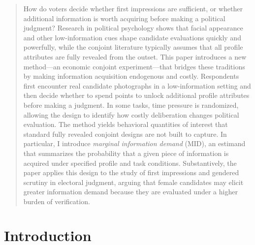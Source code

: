 \documentclass[11pt]{article}
\author[1]{\textsc{Hector Bahamonde}}
\affil[ ]{\small
  \,|\, \href{mailto:hector.bahamonde@utu.fi}{hector.bahamonde@utu.fi} \,|\, 
 \vspace{1cm}
}
\affil[1]{Senior Researcher, University of Turku, Finland}
\date{\today}
\begin{document}
\maketitle

\begin{abstract}
How do voters decide whether first impressions are sufficient, or whether additional information is worth acquiring before making a political judgment? Research in political psychology shows that facial appearance and other low-information cues shape candidate evaluations quickly and powerfully, while the conjoint literature typically assumes that all profile attributes are fully revealed from the outset. This paper introduces a new method---an economic conjoint experiment---that bridges these traditions by making information acquisition endogenous and costly. Respondents first encounter real candidate photographs in a low-information setting and then decide whether to spend points to unlock additional profile attributes before making a judgment. In some tasks, time pressure is randomized, allowing the design to identify how costly deliberation changes political evaluation. The method yields behavioral quantities of interest that standard fully revealed conjoint designs are not built to capture. In particular, I introduce \emph{marginal information demand} (MID), an estimand that summarizes the probability that a given piece of information is acquired under specified profile and task conditions. Substantively, the paper applies this design to the study of first impressions and gendered scrutiny in electoral judgment, arguing that female candidates may elicit greater information demand because they are evaluated under a higher burden of verification.
\end{abstract}

\newpage

\section*{Introduction}
\end{document}

